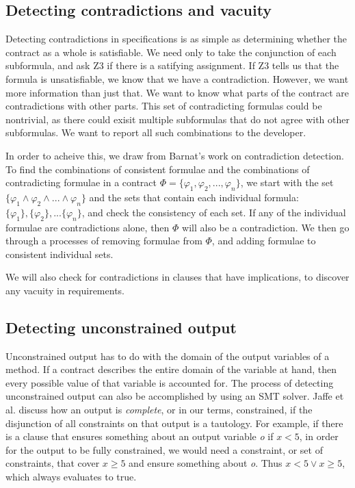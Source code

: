 \documentclass{article}
\newif\ifcomments
\newcommand{\egm}[1]{\ifcomments\textcolor{orange}{egm: #1}\fi}
\begin{document}
\subsection{Detecting contradictions and vacuity}

Detecting contradictions in specifications is as simple as determining whether the contract as a whole is satisfiable.
We need only to take the conjunction of each subformula, and ask Z3 if there is a satifying assignment. If Z3 tells us that the
formula is unsatisfiable, we know that we have a contradiction. However, we want more information than just that. We
want to know what parts of the contract are contradictions with other parts. This set of contradicting formulas could be
nontrivial, as there could exisit multiple subformulas that do not agree with other subformulas. We want to report all
such combinations to the developer.

In order to acheive this, we draw from Barnat's \cite{barnat2016analysing} work on contradiction detection.
To find the combinations of consistent formulae and the combinations of contradicting formulae in a contract
\(\Phi = \{\varphi_{1}, \varphi_{2}, ..., \varphi_{n}\}\), we start with the set \(\{\varphi_{1} \land \varphi_{2} \land ... \land \varphi_{n}\} \)
and the sets that contain each individual formula: \(\{\varphi_{1}\}, \{\varphi_{2}\}, ... \{\varphi_{n}\} \), and check
the consistency of each set. If any of the individual formulae are contradictions alone, then \(\Phi\) will also be a contradiction.
We then go through a processes of removing formulae from \(\Phi\), and adding formulae to consistent individual sets.

We will also check for contradictions in clauses that have implications, to discover any vacuity in requirements.

\subsection{Detecting unconstrained output}

Unconstrained output has to do with the domain of the output variables of a method. If a contract describes the entire
domain of the variable at hand, then every possible value of that variable is accounted for. The process of detecting
unconstrained output can also be accomplished by using an SMT solver. Jaffe et al. \cite{jaffe1989completeness} discuss how
an output is \emph{complete}, or in our terms, constrained, if the disjunction of all constraints on that output is a
tautology. For example, if there is a clause that ensures something about an output variable {\it o} if \(x < 5\), in order
for the output to be fully constrained, we would need a constraint, or set of constraints, that cover \(x \geq 5\) and ensure 
something about {\it o}. Thus \(x < 5 \lor x \geq 5\), which always evaluates to true. \egm{This statement is not correct. Try it in dafny. What happens is that dafny can prove something about the output when $x < 5$ but it can say nothing about the output when $x \ge 5$ so any assertion that you write will fail in that case.}
\end{document}
